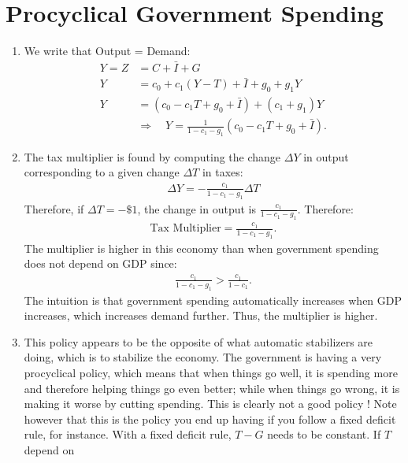 \documentclass[]{book}
\theoremstyle{definition}
\theoremstyle{definition}
\theoremstyle{definition}
\theoremstyle{remark}
\begin{document}
\section{Procyclical Government
Spending}\label{procyclical-government-spending-1}

\begin{enumerate}
\def\labelenumi{\arabic{enumi}.}
\item
  We write that Output = Demand: \[
  \begin{aligned}
  Y=Z &=C+\bar{I}+G\\
  Y   &=c_{0}+c_{1}\left(Y-T\right)+ \bar{I} + g_{0}+g_{1}Y\\
  Y   &=\left(c_{0}-c_{1}T+g_{0}+\bar{I}\right)+\left(c_{1}+g_{1}\right)Y \\
  & \Rightarrow \quad \boxed{Y=\frac{1}{1-c_{1}-g_{1}}\left(c_{0}-c_{1}T+g_{0}+\bar{I}\right)}.
  \end{aligned}
  \]
\item
  The tax multiplier is found by computing the change \(\Delta Y\) in
  output corresponding to a given change \(\Delta T\) in taxes: \[
  \begin{aligned}
  \Delta Y = -\frac{c_1}{1-c_1-g_1}\Delta T
  \end{aligned}
  \] Therefore, if \(\Delta T = -\$ 1\), the change in output is
  \(\frac{c_1}{1-c_1-g_1}\). Therefore: \[
  \begin{aligned}
  \boxed{\text{Tax Multiplier} = \frac{c_1}{1-c_1-g_1}}.
  \end{aligned}
  \] The multiplier is higher in this economy than when government
  spending does not depend on GDP since: \[
  \begin{aligned}
  \frac{c_1}{1-c_1-g_1}>\frac{c_1}{1-c_1}.
  \end{aligned}
  \] The intuition is that government spending automatically increases
  when GDP increases, which increases demand further. Thus, the
  multiplier is higher.
\item
  This policy appears to be the opposite of what automatic stabilizers
  are doing, which is to stabilize the economy. The government is having
  a very procyclical policy, which means that when things go well, it is
  spending more and therefore helping things go even better; while when
  things go wrong, it is making it worse by cutting spending. This is
  clearly not a good policy ! Note however that this is the policy you
  end up having if you follow a fixed deficit rule, for instance. With a
  fixed deficit rule, \(T-G\) needs to be constant. If \(T\) depend on

\end{enumerate}
\end{document}
